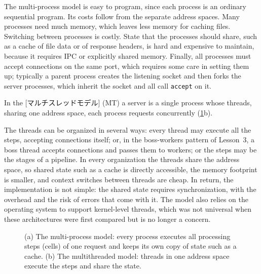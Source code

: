 \documentclass[../main.tex]{subfiles}
\begin{document}
The multi-process model is easy to program, since each process is an
ordinary sequential program.  Its costs follow from the separate address
spaces.  Many processes need much memory, which leaves less memory for
caching files.  Switching between processes is costly.  State that the
processes should share, such as a cache of file data or of response
headers, is hard and expensive to maintain, because it requires IPC or
explicitly shared memory.  Finally, all processes must accept connections on
the same port, which requires some care in setting them up; typically a
parent process creates the listening socket and then forks the server
processes, which inherit the socket and all call \texttt{accept} on it.

\begin{definition}
  In the [マルチスレッドモデル] (MT) a server is a
  single process whose threads, sharing one address space, each process
  requests concurrently (\cref{fig:l06-mp-mt}b).
\end{definition}

The threads can be organized in several ways: every thread may execute all
the steps, accepting connections itself; or, in the boss-workers pattern of
Lesson~3, a boss thread accepts connections and passes them to workers; or
the steps may be the stages of a pipeline.  In every organization the
threads share the address space, so shared state such as a cache is
directly accessible, the memory footprint is smaller, and context switches
between threads are cheap.  In return, the implementation is not simple: the
shared state requires synchronization, with the overhead and the risk of
errors that come with it.  The model also relies on the operating system to
support kernel-level threads, which was not universal when these
architectures were first compared but is no longer a concern.

\begin{figure}[htbp]
  \centering
  
  \caption{(a) The multi-process model: every process executes all
    processing steps (cells) of one request and keeps its own copy of state
    such as a cache.  (b) The multithreaded model: threads in one address
    space execute the steps and share the state.}
  \label{fig:l06-mp-mt}
\end{figure}
\end{document}
